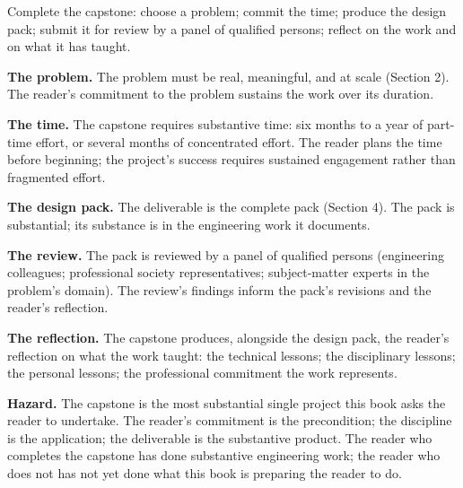 \begin{project}
Complete the capstone: choose a problem; commit the time; produce the design pack; submit it for review by a panel of qualified persons; reflect on the work and on what it has taught.

\textbf{The problem.} The problem must be real, meaningful, and at scale (Section 2). The reader's commitment to the problem sustains the work over its duration.

\textbf{The time.} The capstone requires substantive time: six months to a year of part-time effort, or several months of concentrated effort. The reader plans the time before beginning; the project's success requires sustained engagement rather than fragmented effort.

\textbf{The design pack.} The deliverable is the complete pack (Section 4). The pack is substantial; its substance is in the engineering work it documents.

\textbf{The review.} The pack is reviewed by a panel of qualified persons (engineering colleagues; professional society representatives; subject-matter experts in the problem's domain). The review's findings inform the pack's revisions and the reader's reflection.

\textbf{The reflection.} The capstone produces, alongside the design pack, the reader's reflection on what the work taught: the technical lessons; the disciplinary lessons; the personal lessons; the professional commitment the work represents.

\textbf{Hazard.} The capstone is the most substantial single project this book asks the reader to undertake. The reader's commitment is the precondition; the discipline is the application; the deliverable is the substantive product. The reader who completes the capstone has done substantive engineering work; the reader who does not has not yet done what this book is preparing the reader to do.
\end{project}
